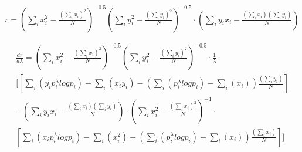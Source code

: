 \newpage

\begin{math}
r=\left(\sum_i{x_i^2}-\frac{\left(\sum_i{x_i}\right)^2}{N}\right)^{-0.5}
\left(\sum_i{y_i^2}-\frac{\left(\sum_i{y_i}\right)^2}{N}\right)^{-0.5}\cdot
\left(\sum_i{y_ix_i} - \frac{\left(\sum_ix_i\right)\left(\sum_iy_i\right)}{N}\right)
\end{math}

\begin{multline}
\frac{dr}{d\lambda}=
\left(\sum_i{x_i^2}-\frac{\left(\sum_i{x_i}\right)^2}{N}\right)^{-0.5}
\left(\sum_i{y_i^2}-\frac{\left(\sum_i{y_i}\right)^2}{N}\right)^{-0.5}\cdot\frac{1}{\lambda}\cdot  \\
[
\left[
\sum_i\left(y_ip_i^{\lambda}log{p_i}\right) -
\sum_i\left(x_iy_i\right) -
\left( \sum_i\left(p_i^{\lambda}log{p_i}\right) - \sum_i\left(x_i\right)  \right)\frac{\left(\sum_iy_i\right)}{N}
\right]  \\
-
\left(\sum_i{y_ix_i} - \frac{\left(\sum_ix_i\right)\left(\sum_iy_i\right)}{N}\right)\cdot
\left(\sum_i{x_i^2}-\frac{\left(\sum_i{x_i}\right)^2}{N}\right)^{-1}
\cdot\\
\left[
\sum_i \left(x_ip_i^{\lambda}log{p_i}\right) - \sum_i \left(x_i^2\right)
-\left( \sum_i \left(p_i^{\lambda}log{p_i}\right) -\sum_i \left(x_i\right) \right)\frac{\left(\sum_i{x_i}\right)}{N}
\right]
]
\end{multline}


